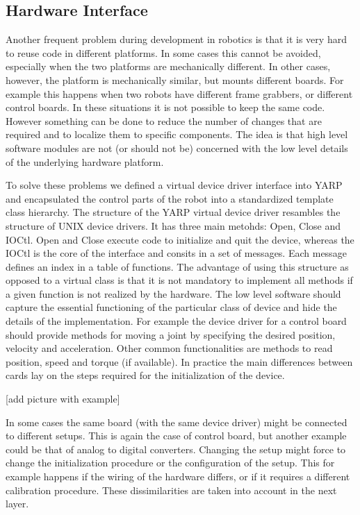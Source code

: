 \subsection{Hardware Interface}
Another frequent problem during development in robotics is that it is very hard to reuse code in different platforms. In some cases this cannot be avoided, especially when the two platforms are mechanically different. In other cases, however, the platform is mechanically similar, but mounts different boards. For example this happens when two robots have different frame grabbers, or different control boards. In these situations it is not possible to keep the same code. However something can be done to reduce the number of changes that are required and to localize them to specific components. The idea is that high level software modules are not (or should not be) concerned with the low level details of the underlying hardware platform. 

To solve these problems we defined a virtual device driver interface into YARP and encapsulated the control parts of the robot into a standardized template class hierarchy. The structure of the YARP virtual device driver resambles the structure of UNIX device drivers. It has three main metohds: Open, Close and IOCtl. Open and Close execute code to initialize and quit the device, whereas the IOCtl is the core of the interface and consits in a set of messages. Each message defines an index in a table of functions. The advantage of using this structure as opposed to a virtual class is that it is not mandatory to implement all methods if a given function is not realized by the hardware. 
The low level software should capture the essential functioning of the particular class of device and hide the details of the implementation. For example the device driver for a control board should provide methods for moving a joint by specifying the desired position, velocity and acceleration. Other common functionalities are methods to read position, speed and torque (if available). In practice the main differences between cards lay on the steps required for the initialization of the device.

[add picture with example]

In some cases the same board (with the same device driver) might be connected to different setups. This is again the case of control board, but another example could be that of analog to digital converters. Changing the setup might force to change the initialization procedure or the configuration of the setup. This for example happens if the wiring of the hardware differs, or if it requires a different calibration procedure. These dissimilarities are taken into account in the next layer. 

